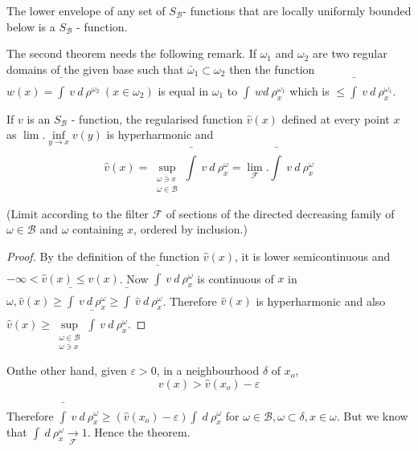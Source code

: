 \begin{thm}\label{p4:chap3:sec11:thm6}%
  The lower envelope of any set of $S_\mathscr{B}$- functions that are
  locally uniformly bounded below is a $S_\mathscr{B}$ - function. 
\end{thm}

The second theorem needs the following remark. If $\omega_1$ and
$\omega_2$ are two regular domains of the given base such that
$\bar{\omega}_1 \subset \omega_2$ then the function $w(x) = \bar{\int}
~ v  ~ d ~ \rho^{\omega_2} ~ (x \in \omega_2)$ is equal in $\omega_1$
to $\int ~ wd ~ \rho^{\omega_1}_x$ which is $\le \bar{\int} ~ v ~ d ~
\rho^{\omega_1}_x$. 

\begin{thm}\label{p4:chap3:sec11:thm7}%
  If $v$ is an $S_\mathscr{B}$ - function, the regularised function
  $\hat{v}(x)$ defined at every point $x$ as $\lim.\inf\limits_{y
    \rightarrow x}v(y)$ is hyperharmonic and  
  $$
  \hat{v}(x) = \sup_{\substack{\omega \ni x \\ \omega \in
      \mathscr{B}}} \bar{\int}  ~ v ~ d ~ \rho^{\omega}_x =
  \lim_{\mathscr{F}}. \bar{\int} ~ v ~ d ~ \rho^\omega_x 
  $$
\end{thm}

(Limit according to the filter $\mathscr{F}$ of sections of the
directed decreasing family of $\omega \in \mathscr{B}$ and $\omega$
containing $x$, ordered by inclusion.) 

\begin{proof} %
  By the definition of the function $\hat{v}(x)$, it is lower
  semicontinuous and $- \infty < \hat{v}(x) \le v(x)$. Now $\bar{\int}
  ~ v ~ d ~ \rho^\omega_x$ is continuous of $x $ in  $\omega,
  \hat{v}(x) \ge \bar{\int} ~ v ~ d ~ \rho^\omega_x \ge\bar{\int} ~
  \hat{v} ~ d ~ \rho^\omega_x$. Therefore $\hat{v}(x)$ is
  hyperharmonic and also $\hat{v}(x) \ge \sup\limits_{\substack{\omega
      \in\mathscr{B} \\ \omega \ni x}} \bar{\int} ~ v ~ d ~
  \rho^\omega_x$. 
\end{proof}

On\pageoriginale the other hand, given $\varepsilon > 0$, in a neighbourhood
$\delta$ of $x_o$,  
$$
v(x) > \hat{v}(x_o) - \varepsilon
$$

Therefore $\bar{\int} ~ v ~ d ~ \rho^\omega_x \ge (\hat{v}(x_o) -
\varepsilon) \int ~ d ~ \rho^\omega_x$ for $\omega \in \mathscr{B},
\omega \subset \delta, x \in \omega$. But we know that $\int ~ d ~
\rho^\omega_x \underset{\mathscr{F}}{\rightarrow} 1$. Hence the
theorem. 


